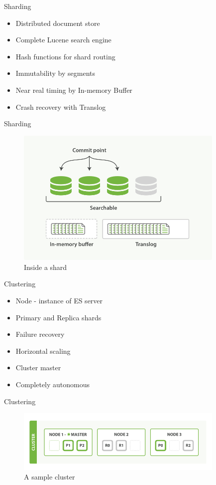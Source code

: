\documentclass[10pt]{beamer}
\begin{document}
\begin{frame}{Sharding}
	\begin{itemize}
		\item Distributed document store
		\item Complete Lucene search engine
		\item Hash functions for shard routing
		\item Immutability by segments
		\item Near real timing by In-memory Buffer
		\item Crash recovery with Translog
	\end{itemize}
\end{frame}

\begin{frame}{Sharding}
	\begin{figure}
		\centering\includegraphics[width=10cm]{inside_shard}
		\caption{Inside a shard}
	\end{figure}
\end{frame}

\begin{frame}{Clustering}
	\begin{itemize}
		\item Node - instance of ES server
		\item Primary and Replica shards
		\item Failure recovery
		\item Horizontal scaling
		\item Cluster master
		\item Completely autonomous
	\end{itemize}
\end{frame}

\begin{frame}{Clustering}
	\begin{figure}
		\centering\includegraphics[width=10cm]{cluster}
		\caption{A sample cluster}
	\end{figure}
\end{frame}
\end{document}
